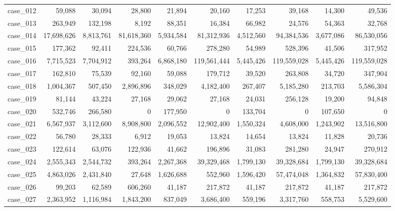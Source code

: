 \begin{footnotesize}
\begin{longtable}{l r rr rr rr rr}
case\_012 & 59{,}088 & 30{,}094 & 28{,}800 & 21{,}894 & 20{,}160 & 17{,}253 & 39{,}168 & 14{,}300 & 49{,}536 \\
case\_013 & 263{,}949 & 132{,}198 & 8{,}192 & 88{,}351 & 16{,}384 & 66{,}982 & 24{,}576 & 54{,}363 & 32{,}768 \\
case\_014 & 17{,}698{,}626 & 8{,}813{,}761 & 81{,}618{,}360 & 5{,}934{,}584 & 81{,}312{,}936 & 4{,}512{,}560 & 94{,}384{,}536 & 3{,}677{,}086 & 86{,}530{,}056 \\
case\_015 & 177{,}362 & 92{,}411 & 224{,}536 & 60{,}766 & 278{,}280 & 54{,}989 & 528{,}396 & 41{,}506 & 317{,}952 \\
case\_016 & 7{,}715{,}523 & 7{,}704{,}912 & 393{,}264 & 6{,}868{,}180 & 119{,}561{,}444 & 5{,}445{,}426 & 119{,}559{,}028 & 5{,}445{,}426 & 119{,}559{,}028 \\
case\_017 & 162{,}810 & 75{,}539 & 92{,}160 & 59{,}088 & 179{,}712 & 39{,}520 & 263{,}808 & 34{,}720 & 347{,}904 \\
case\_018 & 1{,}004{,}367 & 507{,}450 & 2{,}896{,}896 & 348{,}029 & 4{,}182{,}400 & 267{,}407 & 5{,}185{,}280 & 213{,}703 & 5{,}586{,}304 \\
case\_019 & 81{,}144 & 43{,}224 & 27{,}168 & 29{,}062 & 27{,}168 & 24{,}031 & 256{,}128 & 19{,}200 & 94{,}848 \\
case\_020 & 532{,}746 & 266{,}580 & 0 & 177{,}950 & 0 & 133{,}704 & 0 & 107{,}650 & 0 \\
case\_021 & 6{,}567{,}937 & 3{,}112{,}600 & 8{,}908{,}800 & 2{,}096{,}552 & 12{,}902{,}400 & 1{,}550{,}324 & 4{,}608{,}000 & 1{,}243{,}902 & 13{,}516{,}800 \\
case\_022 & 56{,}780 & 28{,}333 & 6{,}912 & 19{,}053 & 13{,}824 & 14{,}654 & 13{,}824 & 11{,}828 & 20{,}736 \\
case\_023 & 122{,}614 & 63{,}076 & 122{,}936 & 41{,}662 & 196{,}896 & 31{,}083 & 281{,}280 & 24{,}947 & 270{,}912 \\
case\_024 & 2{,}555{,}343 & 2{,}544{,}732 & 393{,}264 & 2{,}267{,}368 & 39{,}329{,}468 & 1{,}799{,}130 & 39{,}328{,}684 & 1{,}799{,}130 & 39{,}328{,}684 \\
case\_025 & 4{,}863{,}026 & 2{,}431{,}840 & 27{,}648 & 1{,}626{,}688 & 552{,}960 & 1{,}596{,}420 & 57{,}474{,}048 & 1{,}364{,}832 & 57{,}830{,}400 \\
case\_026 & 99{,}203 & 62{,}589 & 606{,}260 & 41{,}187 & 217{,}872 & 41{,}187 & 217{,}872 & 41{,}187 & 217{,}872 \\
case\_027 & 2{,}363{,}952 & 1{,}116{,}984 & 1{,}843{,}200 & 837{,}049 & 3{,}686{,}400 & 559{,}196 & 3{,}317{,}760 & 558{,}753 & 5{,}529{,}600 \\

\end{longtable}
\end{footnotesize}
